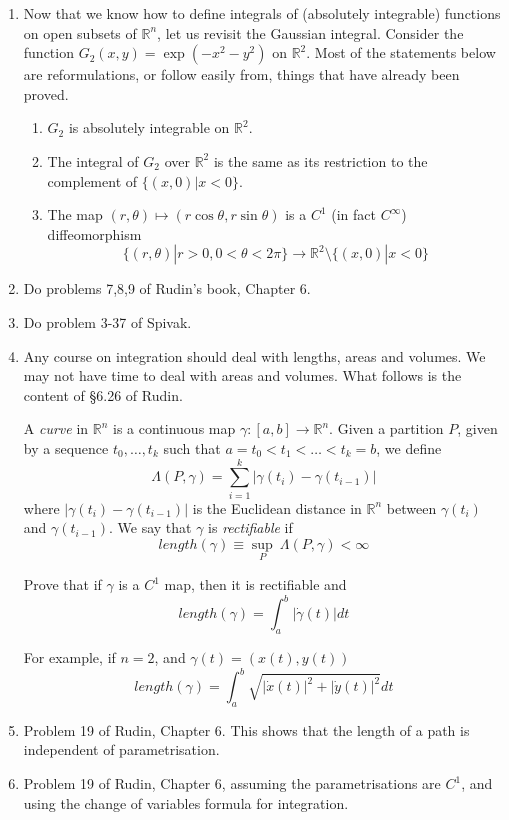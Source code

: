 \documentclass[11pt]{amsart}
\newcommand{\bbR}{\mathbb{R}}
\theoremstyle{definition}
\begin{document}
\begin{enumerate}[wide, labelwidth=!, labelindent=0pt]
\item Now that we know how to define integrals of (absolutely integrable) functions on open subsets of $\bbR^n$, let us revisit the Gaussian integral. Consider the function $G_2(x,y)=\exp(-x^2-y^2)$ on $\bbR^2$. Most of the statements below are reformulations, or follow easily from, things that have already been proved. 
\begin{enumerate}
\item $G_2$ is absolutely integrable on $\bbR^2$.
\item The integral of $G_2$ over $\bbR^2$ is the same as its restriction to the complement of $\{(x,0)|x<0\}$.
\item The map $(r,\theta) \mapsto (r\cos \theta, r \sin \theta)$ is a $C^1$ (in fact $C^\infty$) diffeomorphism
\[
\{(r,\theta)|r>0,0 < \theta < 2\pi\} \longrightarrow \bbR^2 \setminus \{(x,0)|x<0\}
\]
\end{enumerate}

\item Do problems 7,8,9 of Rudin's book, Chapter 6.

\item Do problem 3-37 of Spivak.

\item Any course on integration should deal with lengths, areas and volumes. We may not have time to deal with areas and volumes. What follows is the content of \S 6.26 of Rudin.

A \emph{curve} in $\bbR^n$ is a continuous map $\gamma:[a,b] \to \bbR^n$. Given a partition $P$, given by a sequence $t_0,\dots,t_k$ such that $a=t_0 < t_1 <\dots <t_k=b$, we define
\[
\Lambda(P,\gamma)=\sum_{i=1}^k |\gamma(t_i)  -\gamma(t_{i-1})|
\]
where $|\gamma(t_i)  -\gamma(t_{i-1})|$ is the Euclidean distance in $\bbR^n$ between $\gamma(t_i)$ and  $\gamma(t_{i-1})$. We say that $\gamma$ is \emph{rectifiable} if
\[
length(\gamma) \equiv \underset{P}\sup\ \Lambda(P,\gamma) < \infty
\]

Prove that if $\gamma$ is a $C^1$ map, then it is rectifiable and
\[
length(\gamma) = \int_a^b |\dot{\gamma}(t)|dt
\]

For example, if $n=2$, and $\gamma(t)=(x(t),y(t))$
\[
length(\gamma) = \int_a^b \sqrt{|\dot{x}(t)|^2+|\dot{y}(t)|^2}dt
\]

\item  Problem 19 of Rudin, Chapter 6. This shows that the length of a path is independent of parametrisation.

\item Problem 19 of Rudin, Chapter 6,  assuming the parametrisations are $C^1$, and using the  change of variables formula for integration.

\end{enumerate}
 

 
 
\end{document}
